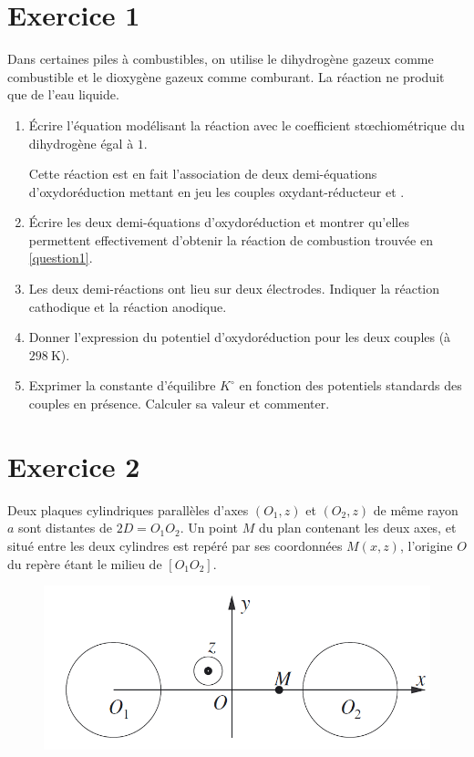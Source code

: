 \documentclass[a4paper,12pt,french]{article}
\begin{document}
\section{Exercice 1}

Dans certaines piles à combustibles, on utilise le dihydrogène gazeux comme combustible et le dioxygène gazeux comme comburant. La réaction ne produit que de l'eau liquide.

\begin{enumerate}
	\item \label{question1} Écrire l'équation modélisant la réaction avec le coefficient stœchiométrique du dihydrogène égal à $1$.
	
	Cette réaction est en fait l'association de deux demi-équations d'oxydoréduction mettant en jeu les couples oxydant-réducteur  et .
	
	\item Écrire les deux demi-équations d'oxydoréduction et montrer qu'elles permettent effectivement d'obtenir la réaction de combustion trouvée en \ref{question1}.
	\item Les deux demi-réactions ont lieu sur deux électrodes. Indiquer la réaction cathodique et la réaction anodique.
	\item Donner l'expression du potentiel d'oxydoréduction pour les deux couples (à $\SI{298}{\kelvin}$).
	\item Exprimer la constante d'équilibre $K^\circ$ en fonction des potentiels standards des couples en présence. Calculer sa valeur et commenter.
\end{enumerate}

\newpage

\section{Exercice 2}

Deux plaques cylindriques parallèles d'axes $(O_1, z)$ et $(O_2, z)$ de même rayon $a$ sont distantes de $2D = O_1O_2$. Un point $M$ du plan contenant les deux axes, et situé entre les deux cylindres est repéré par ses coordonnées $M(x, z)$, l'origine $O$ du repère étant le milieu de $[O_1O_2]$.

\begin{figure}[h]
	\centering
	\includegraphics[width = .7\textwidth]{ex_02.png}
\end{figure}
\end{document}
